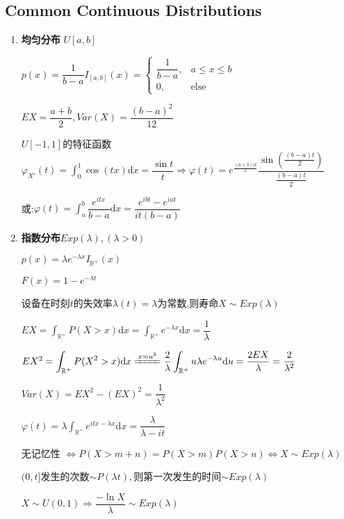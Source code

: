     \subsection{Common Continuous Distributions}
    \begin{enumerate}
      \item \textbf{均匀分布} $U[a,b]$

        $p(x) = \dfrac{1}{b-a}I_{[a,b]}(x) = \left \{ \begin{matrix}\dfrac{1}{b-a}, & a\le x \le b \\0, &  \text{else}\end{matrix}\right.$

        $EX = \dfrac{a+b}{2}, Var(X) = \dfrac{(b-a)^2}{12}$

        $ U[-1,1]$的特征函数$\varphi_{X'}(t)=\int_{0}^1{\cos(tx)\mathrm{d}x} = \dfrac{\sin t}{t}\Rightarrow \varphi(t) =
      e^{\frac{(a+b)it}{2}}\dfrac{\sin(\frac{(b-a)t}{2})}{\frac{(b-a)t}{2}}$

      或:$ \varphi(t) = \int_{a}^b{\dfrac{e^{itx}}{b-a}\mathrm{d}x} = \dfrac{e^{ibt}-e^{iat}}{it(b-a)}$

    \item \textbf{指数分布}$Exp(\lambda),(\lambda > 0)$

      $p(x) = \lambda e^{-\lambda x}I_{\mathbb{R^+}}(x)$

      $F(x) = 1-e^{-\lambda t}$

      设备在时刻$t$的失效率$\lambda(t) = \lambda$为常数,则寿命$X\sim Exp(\lambda)$

      $EX = \int_{\mathbb{R^+}}{P(X>x)\mathrm{d}x} = \int_{\mathbb{R^+}}{e^{-\lambda x}\mathrm{d}x} = \dfrac{1}{\lambda}$

      $ EX^2 = \int_{\mathbb{R^+}}{P(X^2 > x)\mathrm{d}x} \xlongequal{x = u^2} \dfrac{2}{\lambda}\int_{\mathbb{R^+}}{u\lambda e^{-\lambda u}\mathrm{d}u}
      = \dfrac{2EX}{\lambda} = \dfrac{2}{\lambda^2}$

      $Var(X) = EX^2 - (EX)^2 = \dfrac{1}{\lambda^2}$

      $ \varphi(t) = \lambda\int_{\mathbb{R}^+}e^{itx-\lambda x}\mathrm{d}x=\dfrac{\lambda}{\lambda-it}$

      无记忆性 $\Leftrightarrow P(X>m+n) = P(X>m)P(X>n)\Leftrightarrow X\sim Exp(\lambda)$

          $(0,t]$发生的次数$\sim P(\lambda t),$则第一次发生的时间$\sim Exp(\lambda)$

          $ X\sim U(0,1)\Rightarrow  \dfrac{-\ln X}{\lambda}\sim Exp(\lambda)$



\end{enumerate}
